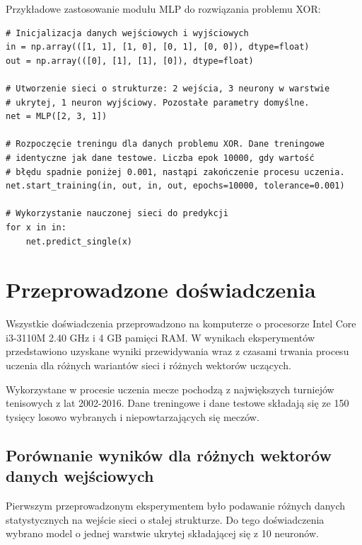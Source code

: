 \pagebreak

Przykładowe zastosowanie modułu MLP do rozwiązania problemu XOR:
\begin{verbatim}
# Inicjalizacja danych wejściowych i wyjściowych
in = np.array(([1, 1], [1, 0], [0, 1], [0, 0]), dtype=float)
out = np.array(([0], [1], [1], [0]), dtype=float)

# Utworzenie sieci o strukturze: 2 wejścia, 3 neurony w warstwie 
# ukrytej, 1 neuron wyjściowy. Pozostałe parametry domyślne.
net = MLP([2, 3, 1])

# Rozpoczęcie treningu dla danych problemu XOR. Dane treningowe 
# identyczne jak dane testowe. Liczba epok 10000, gdy wartość
# błędu spadnie poniżej 0.001, nastąpi zakończenie procesu uczenia.
net.start_training(in, out, in, out, epochs=10000, tolerance=0.001)

# Wykorzystanie nauczonej sieci do predykcji
for x in in:
    net.predict_single(x)
\end{verbatim}



\chapter{Przeprowadzone doświadczenia}

Wszystkie doświadczenia przeprowadzono na komputerze o procesorze Intel Core i3-3110M 2.40 GHz i 4 GB pamięci RAM. W wynikach eksperymentów przedstawiono uzyskane wyniki przewidywania wraz z czasami trwania procesu uczenia dla różnych wariantów sieci i różnych wektorów uczących.

Wykorzystane w procesie uczenia mecze pochodzą z największych turniejów tenisowych z lat 2002-2016. Dane treningowe i dane testowe składają się ze 150 tysięcy losowo wybranych i niepowtarzających się meczów.

\section{Porównanie wyników dla różnych wektorów danych wejściowych}
\label{Sec:VsXIn}

Pierwszym przeprowadzonym eksperymentem było podawanie różnych danych statystycznych na wejście sieci o stałej strukturze. Do tego doświadczenia wybrano model o jednej warstwie ukrytej składającej się z 10 neuronów. 


